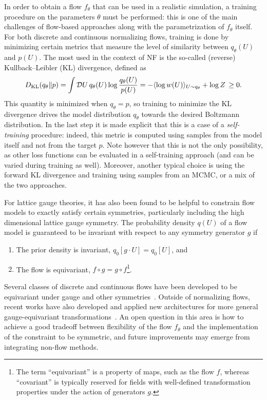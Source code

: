 \documentclass[12pt]{article}
\begin{document}
In order to obtain a flow $f_\theta$ that can be used in a realistic simulation, a training procedure on the parameters $\theta$ must be performed: this is one of the main challenges of flow-based approaches along with the parametrization of $f_{\theta}$ itself. For both discrete and continuous normalizing flows, training is done by minimizing certain metrics that measure the level of similarity between $q_\theta(U)$ and $p(U)$. The most used in the context of NF is the so-called (reverse) Kullback--Leibler (KL) divergence, defined as
\begin{equation}
\label{eq:dkl}
    D_{\rm KL} (q_\theta \| p) = \int \mathcal{D} U \, q_\theta (U) \log \frac{q_\theta (U)}{p(U)} = -\langle \log w (U) \rangle_{U \sim q_\theta} + \log Z \, \geq 0.
\end{equation}
This quantity is minimized when $q_{\theta} = p$, so training to minimize the KL divergence drives the model distribution $q_{\theta}$ towards the desired Boltzmann distribution.
In the last step it is made explicit that this is a case of a \textit{self-training} procedure: indeed, this metric is computed using samples from the model itself and not from the target $p$. Note however that this is not the only possibility, as other loss functions can be evaluated in a self-training approach (and can be varied during training as well). Moreover, another typical choice is using the forward KL divergence and training using samples from an MCMC, or a mix of the two approaches. 

For lattice gauge theories, it has also been found to be helpful to constrain flow models to exactly satisfy certain symmetries, particularly including the high dimensional lattice gauge symmetry. The probability density $q(U)$ of a flow model is guaranteed to be invariant with respect to any symmetry generator $g$ if~\cite{kohler2020equivariant}
\begin{enumerate}
    \item The prior density is invariant, $q_0[g \cdot U] = q_0[U]$, and
    \item The flow is equivariant, $f \circ g = g \circ f$\footnote{The term ``equivariant'' is a property of maps, such as the flow $f$, whereas ``covariant'' is typically reserved for fields with well-defined transformation properties under the action of generators $g$.}.
\end{enumerate}
Several classes of discrete and continuous flows have been developed to be equivariant under gauge and other symmetries~\cite{Kanwar:2020xzo,Boyda:2020hsi,Gerdes:2022eve}.
Outside of normalizing flows, recent works have also developed and applied new architectures for more general gauge-equivariant transformations~\cite{Favoni:2020reg,Nagai:2021bhh,Namekawa:2022liz,Lehner:2023bba,Knüttel:2023w1,Aronsson:2023rli,Lehner:2023prf,Holland:2023lfx}. An open question in this area is how to achieve a good tradeoff between flexibility of the flow $f_\theta$ and the implementation of the constraint to be symmetric, and future improvements may emerge from integrating non-flow methods.
\end{document}
